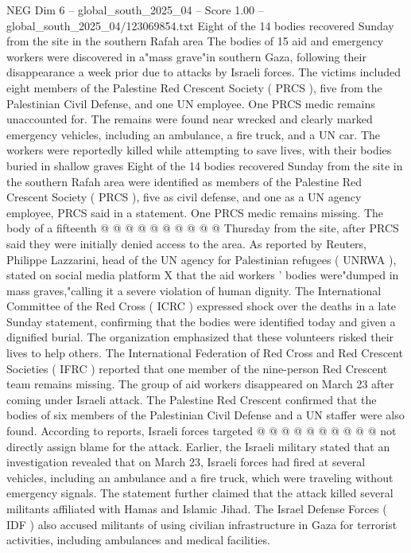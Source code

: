 \begin{textsample}{NEG Dim 6 – global\_south\_2025\_04 – Score 1.00 – global\_south\_2025\_04/123069854.txt}  \label{ex:f6_neg_214}
Eight of the 14 bodies recovered Sunday from the site in the southern Rafah area The bodies of 15 aid and emergency workers were discovered in a"mass grave"in southern Gaza, following their disappearance a week prior due to attacks by Israeli forces.
The victims included eight members of the Palestine Red Crescent Society ( PRCS ), five from the Palestinian Civil Defense, and one UN employee.
One PRCS medic remains unaccounted for.
The remains were found near wrecked and clearly marked emergency vehicles, including an ambulance, a fire truck, and a UN car.
The workers were reportedly killed while attempting to save lives, with their bodies buried in shallow graves Eight of the 14 bodies recovered Sunday from the site in the southern Rafah area were identified as members of the Palestine Red Crescent Society ( PRCS ), five as civil defense, and one as a UN agency employee, PRCS said in a statement.
One PRCS medic remains missing.
The body of a fifteenth @ @ @ @ @ @ @ @ @ @ Thursday from the site, after PRCS said they were initially denied access to the area.
As reported by Reuters, Philippe Lazzarini, head of the UN agency for Palestinian refugees ( UNRWA ), stated on social media platform X that the aid workers ' bodies were"dumped in mass graves,"calling it a severe violation of human dignity.
The International Committee of the Red Cross ( ICRC ) expressed shock over the deaths in a late Sunday statement, confirming that the bodies were identified today and given a dignified burial.
The organization emphasized that these volunteers risked their lives to help others.
The International Federation of Red Cross and Red Crescent Societies ( IFRC ) reported that one member of the nine-person Red Crescent team remains missing.
The group of aid workers disappeared on March 23 after coming under Israeli attack.
The Palestine Red Crescent confirmed that the bodies of six members of the Palestinian Civil Defense and a UN staffer were also found.
According to reports, Israeli forces targeted @ @ @ @ @ @ @ @ @ @ not directly assign blame for the attack.
Earlier, the Israeli military stated that an investigation revealed that on March 23, Israeli forces had fired at several vehicles, including an ambulance and a fire truck, which were traveling without emergency signals.
The statement further claimed that the attack killed several militants affiliated with Hamas and Islamic Jihad.
The Israel Defense Forces ( IDF ) also accused militants of using civilian infrastructure in Gaza for terrorist activities, including ambulances and medical facilities.

\end{textsample}

